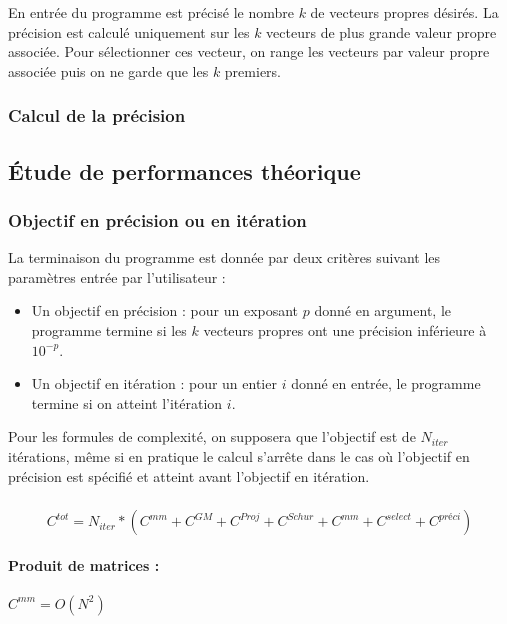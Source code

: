 \documentclass[11pt,a4paper]{article}
\begin{document}
			En entrée du programme est précisé le nombre $k$ de vecteurs propres désirés. La précision est calculé uniquement sur les $k$ vecteurs de plus grande valeur propre associée. Pour sélectionner ces vecteur, on range les vecteurs par valeur propre associée puis on ne garde que les $k$ premiers.

		\subsubsection{Calcul de la précision}

	\subsection{Étude de performances théorique}
		
		\subsubsection{Objectif en précision ou en itération}
			
			La terminaison du programme est donnée par deux critères suivant les paramètres entrée par l'utilisateur :
			\begin{itemize}
				\item Un objectif en précision : pour un exposant $p$ donné en argument, le programme termine si les $k$ vecteurs propres ont une précision inférieure à $10^{-p}$.
				\item Un objectif en itération : pour un entier $i$ donné en entrée, le programme termine si on atteint l'itération $i$.
			\end{itemize}

			Pour les formules de complexité, on supposera que l'objectif est de $N_{iter}$ itérations, même si en pratique le calcul s'arrête dans le cas où l'objectif en précision est spécifié et atteint avant l'objectif en itération.

		\subsubsection{}


			$$
			C^{tot} = N_{iter} * (C^{mm} + C^{GM} + C^{Proj} + C^{Schur} + C^{mm} + C^{select} + C^{préci})
			$$

			\paragraph{Produit de matrices :} $C^{mm} = O(N^2)$
\end{document}
